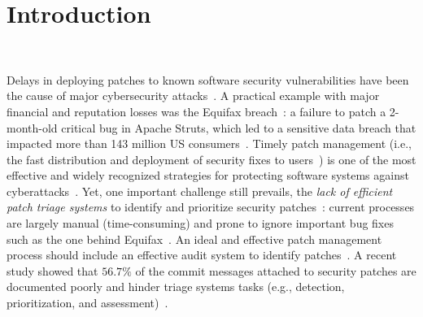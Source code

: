 \section{Introduction}~\label{sec:intro}

Delays in deploying patches to known software security vulnerabilities 
have been the cause of major cybersecurity attacks~\cite{windows-cyberattack,failed-to-deploy-patch,hacker-news-patches,CISA-ALERT,non-applied-patches}. 
A practical example with major financial and reputation losses was the Equifax breach~\cite{failed-to-deploy-patch}: a failure to patch a 2-month-old critical bug in Apache Struts, which led to a sensitive data breach that impacted more than 143 million US consumers~\cite{EQUIFAX-1}. 
Timely patch management (i.e., the fast distribution and deployment 
of security fixes to users~\cite{SOFT-PATCH-MANAG-NIST,DBLP:conf/soups/LiRMMC19,10.5555/3488905.3488919,10.5555/3337432.3337437}) is one of the most effective and widely recognized strategies for 
protecting
software systems against  cyberattacks~\cite{DISSANAYAKE2022106771,SOFT-PATCH-MANAG-NIST}. Yet, one important challenge still prevails, the \emph{lack of efficient patch triage systems} to identify and prioritize security patches~\cite{Zhang2021AnIO, SSPatcher2022,hacker-news-patches,DBLP:conf/soups/LiRMMC19}: current processes are largely manual (time-consuming) and prone to ignore important bug fixes such as the one behind Equifax~\cite{failed-to-deploy-patch}. An ideal and effective patch management process should include an effective audit system to identify patches~\cite{hacker-news-patches}. A recent study showed that $56.7\%$ of the commit messages attached to security patches are documented poorly and hinder  triage systems tasks (e.g., detection, prioritization, and assessment)~\cite{10.1145/3593434.3593481}.  

